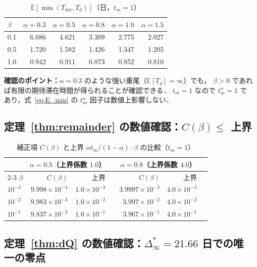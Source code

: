 \documentclass[12pt,a4paper]{article}
\theoremstyle{plain}
\theoremstyle{definition}
\theoremstyle{remark}
\newcommand{\E}{\mathbb{E}}
\newcommand{\Tdet}{T_{\mathrm{det}}}
\newcommand{\Dinf}{\Delta^{*}_{\infty}}
\begin{document}
\begin{table}[h]
\centering
\caption{$\E[\min(\Tdet,T_d)]$（日，$t_m=1$）}
\label{tab:sojourn}
\begin{tabular}{@{}lrrrrr@{}}
\toprule
$\beta$ & $\alpha=0.3$ & $\alpha=0.5$ & $\alpha=0.8$ & $\alpha=1.0$ & $\alpha=1.5$ \\
\midrule
0.1 & 6.086 & 4.621 & 3.309 & 2.775 & 2.027 \\
0.5 & 1.720 & 1.582 & 1.426 & 1.347 & 1.205 \\
1.0 & 0.942 & 0.911 & 0.873 & 0.852 & 0.810 \\
\bottomrule
\end{tabular}
\end{table}

\noindent
\textbf{確認のポイント：}$\alpha=0.3$ のような強い重尾（$\E[T_d]=\infty$）でも，
$\beta>0$ であれば有限の期待滞在時間が得られることが確認できる．
$t_m=1$ なので $t_m^\alpha=1$ であり，式~\eqref{eq:E_min} の $t_m^\alpha$ 因子は数値上影響しない．

\subsection{定理~\ref{thm:remainder} の数値確認：$C(\beta)\le$ 上界}

\begin{table}[h]
\centering
\caption{補正項 $C(\beta)$ と上界 $\alpha t_m/(1-\alpha)\cdot\beta$ の比較（$t_m=1$）}
\label{tab:remainder}
\begin{tabular}{@{}lrrlrrl@{}}
\toprule
& \multicolumn{2}{c}{$\alpha=0.5$（上界係数 $1.0$）} &&
\multicolumn{2}{c}{$\alpha=0.8$（上界係数 $4.0$）}\\
\cmidrule{2-3}\cmidrule{5-6}
$\beta$ & $C(\beta)$ & 上界 && $C(\beta)$ & 上界 \\
\midrule
$10^{-3}$ & $9.998\times10^{-4}$ & $1.0\times10^{-3}$ &&
$3.9997\times10^{-3}$ & $4.0\times10^{-3}$ \\
$10^{-2}$ & $9.983\times10^{-3}$ & $1.0\times10^{-2}$ &&
$3.997\times10^{-2}$ & $4.0\times10^{-2}$ \\
$10^{-1}$ & $9.837\times10^{-2}$ & $1.0\times10^{-1}$ &&
$3.967\times10^{-1}$ & $4.0\times10^{-1}$ \\
\bottomrule
\end{tabular}
\end{table}

\subsection{定理~\ref{thm:dQ} の数値確認：$\Dinf=21.66$ 日での唯一の零点}
\end{document}

